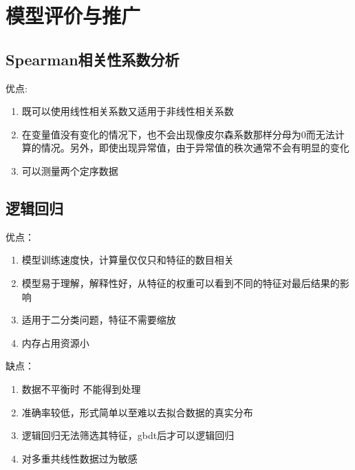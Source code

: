 \section{模型评价与推广}
\subsection{Spearman相关性系数分析}
优点:
\begin{enumerate}
	\item 既可以使用线性相关系数又适用于非线性相关系数
	\item 在变量值没有变化的情况下，也不会出现像皮尔森系数那样分母为0而无法计算的情况。另外，即使出现异常值，由于异常值的秩次通常不会有明显的变化
	\item 可以测量两个定序数据
\end{enumerate}

\subsection{逻辑回归}
优点：
\begin{enumerate}
	\item 模型训练速度快，计算量仅仅只和特征的数目相关
	\item 模型易于理解，解释性好，从特征的权重可以看到不同的特征对最后结果的影响
	\item 适用于二分类问题，特征不需要缩放
	\item 内存占用资源小
\end{enumerate}

缺点：
\begin{enumerate}
	\item 数据不平衡时 不能得到处理
	\item 准确率较低，形式简单以至难以去拟合数据的真实分布
	\item 逻辑回归无法筛选其特征，gbdt后才可以逻辑回归
	\item 对多重共线性数据过为敏感		
\end{enumerate}